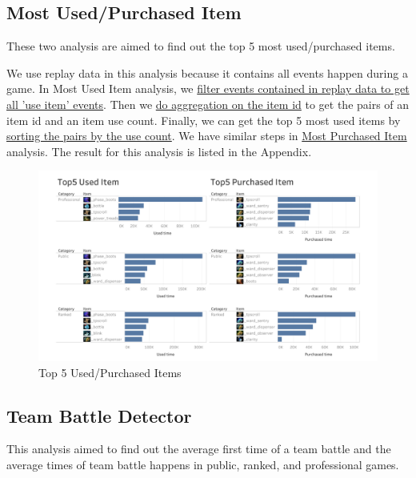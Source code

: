 \documentclass{article}
\begin{document}
\subsection{Most Used/Purchased Item}

These two analysis are aimed to find out the top 5 most used/purchased items.

We use replay data in this analysis because it contains all events happen during a game. In Most Used Item analysis, we \href{https://github.com/Vopaaz/big-data-psg-lgd/blob/master/src/main/scala/MostUsedItem.scala#L38-L40}{filter events contained in replay data to get all 'use item' events}. Then we \href{https://github.com/Vopaaz/big-data-psg-lgd/blob/master/src/main/scala/MostUsedItem.scala#L41-L42}{do aggregation on the item id} to get the pairs of an item id and an item use count. Finally, we can get the top 5 most used items by \href{https://github.com/Vopaaz/big-data-psg-lgd/blob/master/src/main/scala/MostUsedItem.scala#L44}{sorting the pairs by the use count}. We have similar steps in \href{https://github.com/Vopaaz/big-data-psg-lgd/blob/master/src/main/scala/MostPurchasedItem.scala}{Most Purchased Item} analysis. The result for this analysis is listed in the Appendix.

\begin{figure}[H]
\centering
\includegraphics[width=\textwidth]{pic/TopItem.png}
\caption{Top 5 Used/Purchased Items}
\label{Top 5 Used/Purchased Items}
\end{figure}

\subsection{Team Battle Detector}

This analysis aimed to find out the average first time of a team battle and the average times of team battle happens in public, ranked, and professional games.
\end{document}
